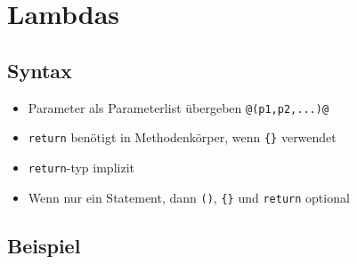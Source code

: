 \section{Lambdas}

\subsection{Syntax}

\begin{itemize}
    \item Parameter als Parameterlist übergeben \lstinline{@(p1,p2,...)@}
    \item \lstinline{return} benötigt in Methodenkörper, wenn \lstinline|{}| verwendet
    \item \lstinline{return}-typ implizit
    \item Wenn nur ein Statement, dann \lstinline|()|, \lstinline|{}| und \lstinline{return} optional
\end{itemize}
\subsection{Beispiel}

